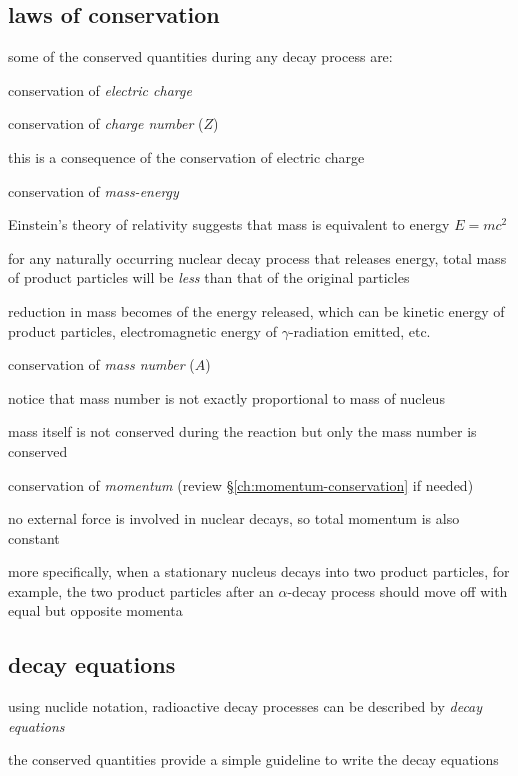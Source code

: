 \subsection{laws of conservation}

some of the conserved quantities during any decay process are:

\cmt conservation of \emph{electric charge}

\cmt conservation of \emph{charge number} ($Z$)

this is a consequence of the conservation of electric charge

\cmt conservation of \emph{mass-energy}

Einstein's theory of relativity suggests that mass is equivalent to energy $E=mc^2$

for any naturally occurring nuclear decay process that releases energy, total mass of product particles will be \emph{less} than that of the original particles

reduction in mass becomes of the energy released, which can be kinetic energy of product particles, electromagnetic energy of $\gamma$-radiation emitted, etc.

\cmt conservation of \emph{mass number} ($A$)

notice that mass number is not exactly proportional to mass of nucleus

mass itself is not conserved during the reaction but only the mass number is conserved

\cmt conservation of \emph{momentum} (review \S\ref{ch:momentum-conservation} if needed)

no external force is involved in nuclear decays, so total momentum is also constant

more specifically, when a stationary nucleus decays into two product particles, for example, the two product particles after an $\alpha$-decay process should move off with equal but opposite momenta


\subsection{decay equations}

using nuclide notation, radioactive decay processes can be described by \emph{decay equations}

the conserved quantities provide a simple guideline to write the decay equations 

